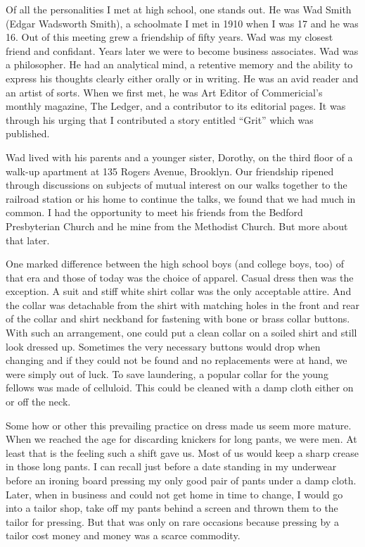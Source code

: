 \documentclass[12pt]{book}              %
\begin{document}
Of all the personalities I met at high school, one stands out. He was Wad Smith (Edgar Wadsworth Smith), a schoolmate I met in 1910 when I was 17 and he was 16. Out of this meeting grew a friendship of fifty years. Wad was my closest friend and confidant. Years later we were to become business associates. Wad was a philosopher. He had an analytical mind, a retentive memory and the ability to express his thoughts clearly either orally or in writing. He was an avid reader and an artist of sorts. When we first met, he was Art Editor of Commericial's monthly magazine, The Ledger, and a contributor to its editorial pages. It was through his urging that I contributed a story entitled ``Grit'' which was published.

Wad lived with his parents and a younger sister, Dorothy, on the third floor of a walk-up apartment at 135 Rogers Avenue, Brooklyn. Our friendship ripened through discussions on subjects of mutual interest on our walks together to the railroad station or his home to continue the talks, we found that we had much in common. I had the opportunity to meet his friends from the Bedford Presbyterian Church and he mine from the Methodist Church. But more about that later.

One marked difference between the high school boys (and college boys, too) of that era and those of today was the choice of apparel. Casual dress then was the exception. A suit and stiff white shirt collar was the only acceptable attire. And the collar was detachable from the shirt with matching holes in the front and rear of the collar and shirt neckband for fastening with bone or brass collar buttons. With such an arrangement, one could put a clean collar on a soiled shirt and still look dressed up. Sometimes the very necessary buttons would drop when changing and if they could not be found and no replacements were at hand, we were simply out of luck. To save laundering, a popular collar for the young fellows was made of celluloid. This could be cleaned with a damp cloth either on or off the neck.

Some how or other this prevailing practice on dress made us seem more mature. When we reached the age for discarding knickers for long pants, we were men. At least that is the feeling such a shift gave us. Most of us would keep a sharp crease in those long pants. I can recall just before a date standing in my underwear before an ironing board pressing my only good pair of pants under a damp cloth. Later, when in business and could not get home in time to change, I would go into a tailor shop, take off my pants behind a screen and thrown them to the tailor for pressing. But that was only on rare occasions because pressing by a tailor cost money and money was a scarce commodity. 
\end{document}

